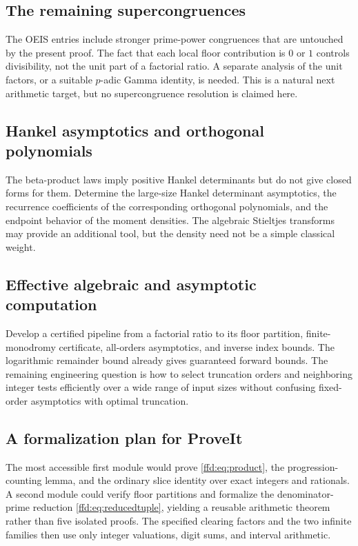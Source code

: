 \documentclass[11pt]{article}
\theoremstyle{definition}
\theoremstyle{remark}
\begin{document}
\subsection{The remaining supercongruences}
The OEIS entries include stronger prime-power congruences that are untouched
by the present proof. The fact that each local floor contribution is $0$ or
$1$ controls divisibility, not the unit part of a factorial ratio. A separate
analysis of the unit factors, or a suitable $p$-adic Gamma identity, is needed.
This is a natural next arithmetic target, but no supercongruence resolution
is claimed here.

\subsection{Hankel asymptotics and orthogonal polynomials}
The beta-product laws imply positive Hankel determinants but do not give
closed forms for them. Determine the large-size Hankel determinant
asymptotics, the recurrence coefficients of the corresponding orthogonal
polynomials, and the endpoint behavior of the moment densities. The algebraic
Stieltjes transforms may provide an additional tool, but the density need
not be a simple classical weight.

\subsection{Effective algebraic and asymptotic computation}
Develop a certified pipeline from a factorial ratio to its floor partition,
finite-monodromy certificate, all-orders asymptotics, and inverse index
bounds. The logarithmic remainder bound already gives guaranteed forward
bounds. The remaining engineering question is how to select truncation
orders and neighboring integer tests efficiently over a wide range of input
sizes without confusing fixed-order asymptotics with optimal truncation.

\subsection{A formalization plan for ProveIt}
The most accessible first module would prove \eqref{ffd:eq:product}, the
progression-counting lemma, and the ordinary slice identity over exact
integers and rationals. A second module could verify floor partitions and
formalize the denominator-prime reduction \eqref{ffd:eq:reducedtuple}, yielding
a reusable arithmetic theorem rather than five isolated proofs. The
specified clearing factors and the two infinite families then use only
integer valuations, digit sums, and interval arithmetic.
\end{document}
